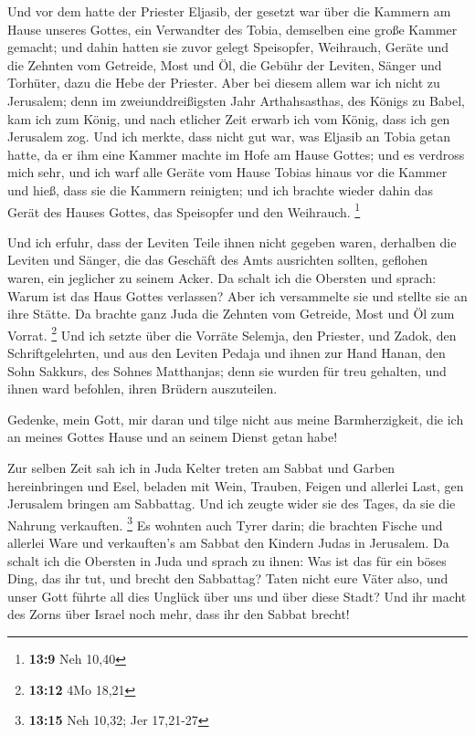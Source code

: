  Und vor dem hatte der Priester Eljasib, der gesetzt war
über die Kammern am Hause unseres Gottes, ein Verwandter des Tobia,
demselben eine große Kammer gemacht;  und dahin hatten sie
zuvor gelegt Speisopfer, Weihrauch, Geräte und die Zehnten vom Getreide,
Most und Öl, die Gebühr der Leviten, Sänger und Torhüter, dazu die Hebe
der Priester.  Aber bei diesem allem war ich nicht zu
Jerusalem; denn im zweiunddreißigsten Jahr Arthahsasthas, des Königs zu
Babel, kam ich zum König, und nach etlicher Zeit erwarb ich vom König,
 dass ich gen Jerusalem zog. Und ich merkte, dass nicht
gut war, was Eljasib an Tobia getan hatte, da er ihm eine Kammer machte
im Hofe am Hause Gottes;  und es verdross mich sehr, und
ich warf alle Geräte vom Hause Tobias hinaus vor die Kammer
 und hieß, dass sie die Kammern reinigten; und ich brachte
wieder dahin das Gerät des Hauses Gottes, das Speisopfer und den
Weihrauch. \footnote{\textbf{13:9} Neh 10,40}

 Und ich erfuhr, dass der Leviten Teile ihnen nicht
gegeben waren, derhalben die Leviten und Sänger, die das Geschäft des
Amts ausrichten sollten, geflohen waren, ein jeglicher zu seinem Acker.
 Da schalt ich die Obersten und sprach: Warum ist das
Haus Gottes verlassen? Aber ich versammelte sie und stellte sie an ihre
Stätte.  Da brachte ganz Juda die Zehnten vom Getreide,
Most und Öl zum Vorrat. \footnote{\textbf{13:12} 4Mo 18,21}
 Und ich setzte über die Vorräte Selemja, den Priester,
und Zadok, den Schriftgelehrten, und aus den Leviten Pedaja und ihnen
zur Hand Hanan, den Sohn Sakkurs, des Sohnes Matthanjas; denn sie wurden
für treu gehalten, und ihnen ward befohlen, ihren Brüdern auszuteilen.

 Gedenke, mein Gott, mir daran und tilge nicht aus meine
Barmherzigkeit, die ich an meines Gottes Hause und an seinem Dienst
getan habe!

 Zur selben Zeit sah ich in Juda Kelter treten am Sabbat
und Garben hereinbringen und Esel, beladen mit Wein, Trauben, Feigen und
allerlei Last, gen Jerusalem bringen am Sabbattag. Und ich zeugte wider
sie des Tages, da sie die Nahrung verkauften. \footnote{\textbf{13:15}
  Neh 10,32; Jer 17,21-27}  Es wohnten auch Tyrer darin;
die brachten Fische und allerlei Ware und verkauften's am Sabbat den
Kindern Judas in Jerusalem.  Da schalt ich die Obersten
in Juda und sprach zu ihnen: Was ist das für ein böses Ding, das ihr
tut, und brecht den Sabbattag?  Taten nicht eure Väter
also, und unser Gott führte all dies Unglück über uns und über diese
Stadt? Und ihr macht des Zorns über Israel noch mehr, dass ihr den
Sabbat brecht!

